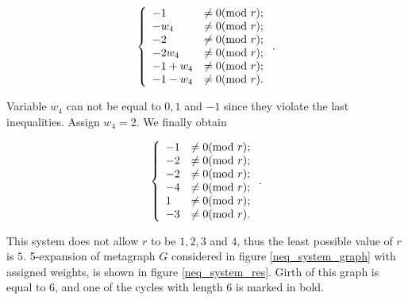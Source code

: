 \documentclass[leqno]{aadmbook}
\renewcommand{\mod}[1]{\textrm{mod}\ #1}
\begin{document}
\begin{equation}
    \centering
    \left\{
        \begin{array}{ll}
            - 1 &\neq 0        (\mod{r}); \\
            - w_4 &\neq 0      (\mod{r}); \\
            - 2 &\neq 0        (\mod{r}); \\
            - 2 w_4 &\neq 0    (\mod{r}); \\
            - 1 + w_4 &\neq 0  (\mod{r}); \\
            - 1 - w_4 &\neq 0  (\mod{r}). \\
        \end{array}
    \right..
    \label{eqs:cycle_search_neqs_3}
\end{equation}

Variable $w_4$ can not be equal to $0, 1$ and $-1$ since they violate the last inequalities. Assign $w_4 = 2$. We finally obtain

\begin{equation}
    \centering
    \left\{
        \begin{array}{ll}
            - 1 &\neq 0    (\mod{r}) ; \\
            - 2 &\neq 0    (\mod{r}) ; \\
            - 2 &\neq 0    (\mod{r}) ; \\
            - 4 &\neq 0    (\mod{r}) ; \\
              1 &\neq 0    (\mod{r}) ; \\
            - 3 &\neq 0    (\mod{r}) . \\
        \end{array}
    \right..
    \label{eqs:cycle_search_neqs_4}
\end{equation}

This system does not allow $r$ to be $1, 2, 3$ and $4$, thus the least possible value of $r$ is $5$. 5-expansion of metagraph $G$ considered in figure \ref{neq_system_graph} with assigned weights, is shown in figure \ref{neq_system_res}. Girth of this graph is equal to $6$, and one of the cycles with length $6$ is marked in bold.
\end{document}
